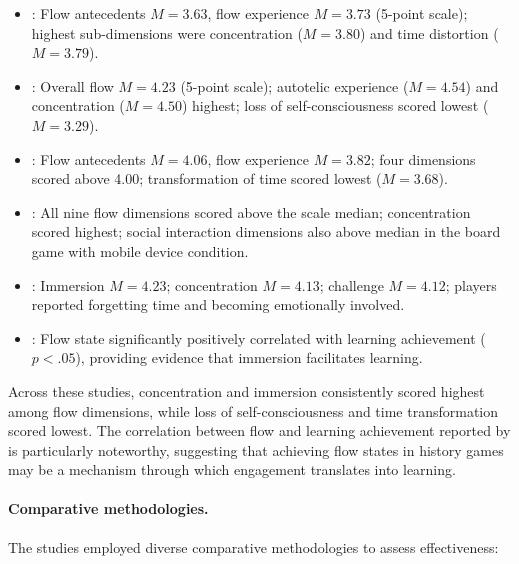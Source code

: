 \documentclass[a4paper,fleqn]{cas-sc}
\begin{document}
\begin{itemize}[noitemsep]
 \item \citet{16Chen201447}: Flow antecedents $M=3.63$, flow experience $M=3.73$ (5-point scale); highest sub-dimensions were concentration ($M=3.80$) and time distortion ($M=3.79$).
 \item \citet{63Liu2021}: Overall flow $M=4.23$ (5-point scale); autotelic experience ($M=4.54$) and concentration ($M=4.50$) highest; loss of self-consciousness scored lowest ($M=3.29$).
 \item \citet{64Hsu201324}: Flow antecedents $M=4.06$, flow experience $M=3.82$; four dimensions scored above 4.00; transformation of time scored lowest ($M=3.68$).
 \item \citet{70Hou201519}: All nine flow dimensions scored above the scale median; concentration scored highest; social interaction dimensions also above median in the board game with mobile device condition.
 \item \citet{48Moketar2021}: Immersion $M=4.23$; concentration $M=4.13$; challenge $M=4.12$; players reported forgetting time and becoming emotionally involved.
 \item \citet{45Yu2016727}: Flow state significantly positively correlated with learning achievement ($p<.05$), providing evidence that immersion facilitates learning.
\end{itemize}

Across these studies, concentration and immersion consistently scored highest among flow dimensions, while loss of self-consciousness and time transformation scored lowest. The correlation between flow and learning achievement reported by \citet{45Yu2016727} is particularly noteworthy, suggesting that achieving flow states in history games may be a mechanism through which engagement translates into learning.

\paragraph{Comparative methodologies.}

The studies employed diverse comparative methodologies to assess effectiveness:
\end{document}
